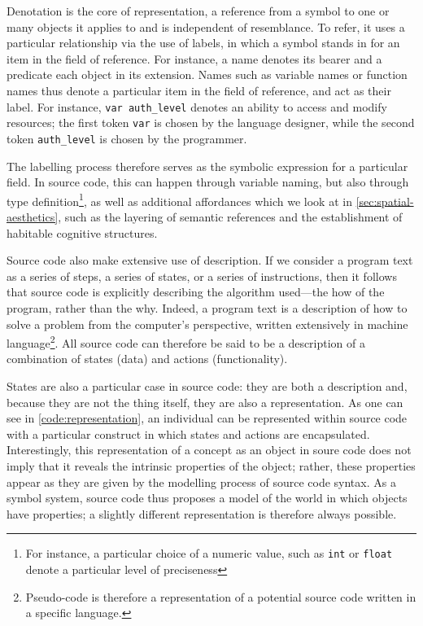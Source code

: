 Denotation is the core of representation, a reference from a symbol to one or many objects it applies to and is independent of resemblance. To refer, it uses a particular relationship via the use of labels, in which a symbol stands in for an item in the field of reference. For instance, a name denotes its bearer and a predicate each object in its extension. Names such as variable names or function names thus denote a particular item in the field of reference, and act as their label. For instance, \lstinline{var auth_level} denotes an ability to access and modify resources; the first token \lstinline{var} is chosen by the language designer, while the second token \lstinline{auth_level} is chosen by the programmer.

The labelling process therefore serves as the symbolic expression for a particular field. In source code, this can happen through variable naming, but also through type definition\footnote{For instance, a particular choice of a numeric value, such as \lstinline{int} or \lstinline{float} denote a particular level of preciseness}, as well as additional affordances which we look at in \ref{sec:spatial-aesthetics}, such as the layering of semantic references and the establishment of habitable cognitive structures.

Source code also make extensive use of description. If we consider a program text as a series of steps, a series of states, or a series of instructions, then it follows that source code is explicitly describing the algorithm used—the how of the program, rather than the why. Indeed, a program text is a description of how to solve a problem from the computer's perspective, written extensively in machine language\footnote{Pseudo-code is therefore a representation of a potential source code written in a specific language.}. All source code can therefore be said to be a description of a combination of states (data) and actions (functionality).

States are also a particular case in source code: they are both a description and, because they are not the thing itself, they are also a representation. As one can see in \ref{code:representation}, an individual can be represented within source code with a particular construct in which states and actions are encapsulated. Interestingly, this representation of a concept as an object in soure code does not imply that it reveals the intrinsic properties of the object; rather, these properties appear as they are given by the modelling process of source code syntax. As a symbol system, source code thus proposes a model of the world in which objects have properties; a slightly different representation is therefore always possible.

